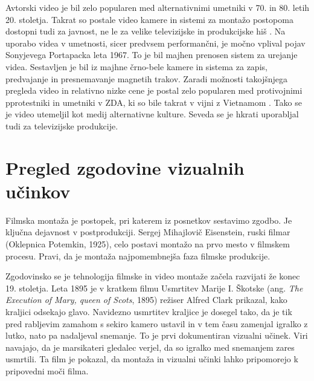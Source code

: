 \documentclass[a4paper, 12pt]{book}
\begin{document}
Avtorski video je bil zelo popularen med alternativnimi umetniki v 70. in 80. letih 20. stoletja.
Takrat so postale video kamere in sistemi za montažo postopoma dostopni tudi za javnost, ne le za velike televizijske in produkcijske hiš \cite{rekonFikc}.
Na uporabo videa v umetnosti, sicer predvsem performančni, je močno vplival pojav Sonyjevega Portapacka leta 1967.
To je bil majhen prenosen sistem za urejanje videa. 
Sestavljen je bil iz majhne črno-bele kamere in sistema za zapis, predvajanje in presnemavanje magnetih trakov.
Zaradi možnosti takojšnjega pregleda video in relativno nizke cene je postal zelo popularen med protivojnimi pprotestniki in umetniki v ZDA, ki so bile takrat v vijni z Vietnamom \cite{videosfera1}.
Tako se je video utemeljil kot medij alternativne kulture.
Seveda se je hkrati uporabljal tudi za televizijske produkcije.






\section{Pregled zgodovine vizualnih učinkov}

Filmska montaža je postopek, pri katerem iz posnetkov sestavimo zgodbo. 
Je ključna dejavnost v postprodukciji. 
Sergej Mihajlovič Eisenstein, ruski filmar (Oklepnica Potemkin, 1925), celo postavi montažo na prvo mesto v filmskem procesu.
Pravi, da je montaža najpomembnejša faza filmske produkcije. %

Zgodovinsko se je tehnologija filmske in video montaže začela razvijati že konec 19. stoletja. 
Leta 1895 je v kratkem filmu Usmrtitev Marije I. Škotske (ang. {\it The Execution of Mary, queen of Scots}, 1895) režiser Alfred Clark prikazal, kako kraljici odsekajo glavo. 
Navidezno usmrtitev kraljice je dosegel tako, da je tik pred rabljevim zamahom s sekiro kamero ustavil in v tem času zamenjal igralko z lutko, nato pa nadaljeval snemanje. 
To je prvi dokumentiran vizualni učinek. 
Viri navajajo, da je marsikateri gledalec verjel, da so igralko med snemanjem zares usmrtili. %
Ta film je pokazal, da montaža in vizualni učinki lahko pripomorejo k pripovedni moči filma.
\end{document}
